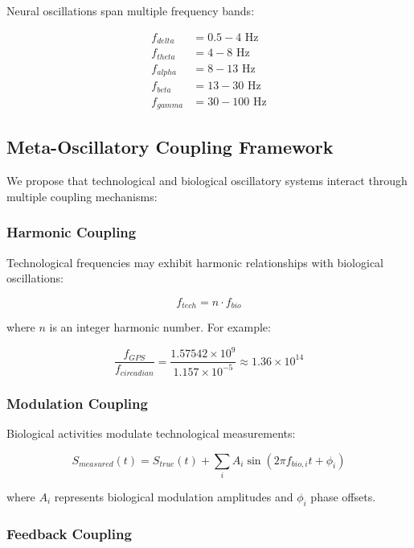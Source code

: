\documentclass[12pt]{article}
\begin{document}
Neural oscillations span multiple frequency bands:

\begin{align}
f_{delta} &= 0.5-4 \text{ Hz} \\
f_{theta} &= 4-8 \text{ Hz} \\
f_{alpha} &= 8-13 \text{ Hz} \\
f_{beta} &= 13-30 \text{ Hz} \\
f_{gamma} &= 30-100 \text{ Hz}
\end{align}

\subsection{Meta-Oscillatory Coupling Framework}

We propose that technological and biological oscillatory systems interact through multiple coupling mechanisms:

\subsubsection{Harmonic Coupling}

Technological frequencies may exhibit harmonic relationships with biological oscillations:

\begin{equation}
f_{tech} = n \cdot f_{bio}
\end{equation}

where $n$ is an integer harmonic number. For example:

\begin{equation}
\frac{f_{GPS}}{f_{circadian}} = \frac{1.57542 \times 10^9}{1.157 \times 10^{-5}} \approx 1.36 \times 10^{14}
\end{equation}

\subsubsection{Modulation Coupling}

Biological activities modulate technological measurements:

\begin{equation}
S_{measured}(t) = S_{true}(t) + \sum_i A_i \sin(2\pi f_{bio,i} t + \phi_i)
\end{equation}

where $A_i$ represents biological modulation amplitudes and $\phi_i$ phase offsets.

\subsubsection{Feedback Coupling}
\end{document}
